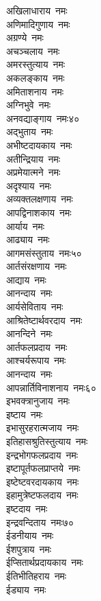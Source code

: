 \begin{multicols}{\maxColumns}
\begin{flushleft}
अखिलाधाराय~नमः\\
अणिमादिगुणाय~नमः\\
अग्रण्ये~नमः\\
अचञ्चलाय~नमः\\
अमरस्तुत्याय~नमः\\
अकलङ्काय~नमः\\
अमिताशनाय~नमः\\
अग्निभुवे~नमः\\
अनवद्याङ्गाय~नमः\hfill ४०\\
अद्भुताय~नमः\\
अभीष्टदायकाय~नमः\\
अतीन्द्रियाय~नमः\\
अप्रमेयात्मने~नमः\\
अदृश्याय~नमः\\
अव्यक्तलक्षणाय~नमः\\
आपद्विनाशकाय~नमः\\
आर्याय~नमः\\
आढ्याय~नमः\\
आगमसंस्तुताय~नमः\hfill ५०\\
आर्तसंरक्षणाय~नमः\\
आद्याय~नमः\\
आनन्दाय~नमः\\
आर्यसेविताय~नमः\\
आश्रितेष्टार्थवरदाय~नमः\\
आनन्दिने~नमः\\
आर्तफलप्रदाय~नमः\\
आश्चर्यरूपाय~नमः\\
आनन्दाय~नमः\\
आपन्नार्तिविनाशनाय~नमः\hfill ६०\\
इभवक्त्रानुजाय~नमः\\
इष्टाय~नमः\\
इभासुरहरात्मजाय~नमः\\
इतिहासश्रुतिस्तुत्याय~नमः\\
इन्द्रभोगफलप्रदाय~नमः\\
इष्टापूर्तफलप्राप्तये~नमः\\
इष्टेष्टवरदायकाय~नमः\\
इहामुत्रेष्टफलदाय~नमः\\
इष्टदाय~नमः\\
इन्द्रवन्दिताय~नमः\hfill ७०\\
ईडनीयाय~नमः\\
ईशपुत्राय~नमः\\
ईप्सितार्थप्रदायकाय~नमः\\
ईतिभीतिहराय~नमः\\
ईड्याय~नमः\\

\end{flushleft}
\end{multicols}
